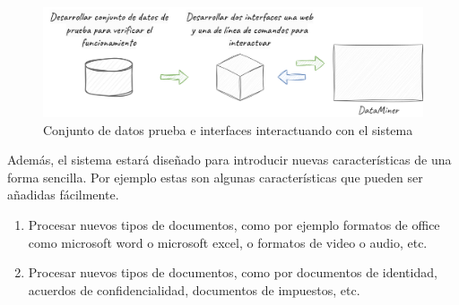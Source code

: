 \begin{figure}[ht]
    \begin{center}
        \includegraphics[width=\textwidth]{chapter/1/images/chapter_1.specific_b}
        \caption{Conjunto de datos prueba e interfaces interactuando con el sistema}
        \label{fig:chapter_1.specific_b}
    \end{center}
\end{figure}

Además, el sistema estará diseñado para introducir nuevas características de una forma sencilla.
Por ejemplo estas son algunas características que pueden ser añadidas fácilmente.

\begin{enumerate}
    \item
    Procesar nuevos tipos de documentos, como por ejemplo formatos de office como microsoft word o microsoft excel,
    o formatos de video o audio, etc.
    \item
    Procesar nuevos tipos de documentos, como por documentos de identidad, acuerdos de confidencialidad, documentos
    de impuestos, etc.
\end{enumerate}